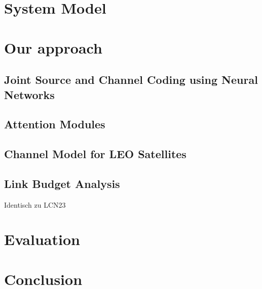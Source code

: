 \documentclass[conference]{IEEEtran}
\begin{document}
\section{System Model}
\label{sec:system_model}

\section{Our approach}
\subsection{Joint Source and Channel Coding using Neural Networks}
\subsection{Attention Modules}
\subsection{Channel Model for LEO Satellites}
\subsection{Link Budget Analysis}
Identisch zu LCN23

\section{Evaluation}
\section{Conclusion}




\end{document}
